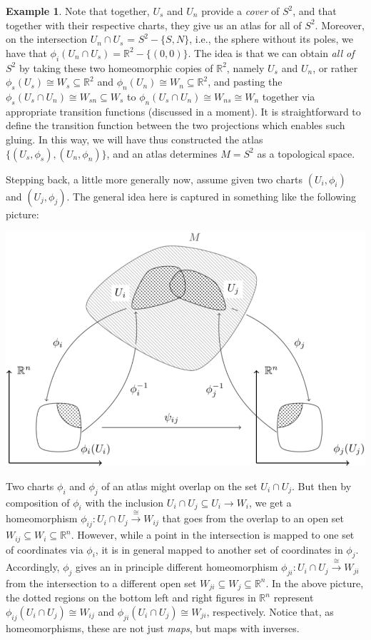 \documentclass[a4paper]{book}
\theoremstyle{definition}
\newtheorem{example}{Example}[section]
\theoremstyle{definition}
\theoremstyle{definition}
\theoremstyle{theorem}
\theoremstyle{definition}
\begin{document}
\begin{example}
	Note that together, $U_s$ and $U_n$ provide a \textit{cover} of $S^2$, and that together with their respective charts, they give us an atlas for all of $S^2$. Moreover, on the intersection $U_n \cap U_s$ = $S^2 - \{S,N\}$, i.e., the sphere without its poles, we have that $\phi_i(U_n \cap U_s) = \mathbb{R}^2 - \{(0,0)\}$. The idea is that we can obtain \textit{all of} $S^2$ by taking these two homeomorphic copies of $\mathbb{R}^2$, namely $U_s$ and $U_n$, or rather $\phi_s(U_s) \cong W_s \subseteq \mathbb{R}^2$ and $\phi_n(U_n) \cong W_n \subseteq \mathbb{R}^2$, and pasting the $\phi_s(U_s \cap U_n) \cong W_{sn} \subseteq W_s$ to $\phi_n(U_s \cap U_n) \cong W_{ns} \cong W_n$ together via appropriate transition functions (discussed in a moment). It is straightforward to define the transition function between the two projections which enables such gluing. In this way, we will have thus constructed the atlas $\{(U_s, \phi_s), (U_n, \phi_n)\}$, and an atlas determines $M = S^2$ as a topological space. \par 
	Stepping back, a little more generally now, assume given two charts $(U_i, \phi_i)$ and $(U_j, \phi_j)$. The general idea here is captured in something like the following picture: 
	\begin{center} 
		\includegraphics[scale=0.33]{Manifold1BW.png}
	\end{center} 
	Two charts $\phi_i$ and $\phi_j$ of an atlas might overlap on the set $U_i \cap U_j$. But then by composition of $\phi_i$ with the inclusion $U_i \cap U_j \subseteq U_i \rightarrow W_i$, we get a homeomorphism $\phi_{ij}: U_i \cap U_j \xrightarrow{\cong} W_{ij}$ that goes from the overlap to an open set $W_{ij} \subseteq W_i \subseteq \mathbb{R}^n$. However, while a point in the intersection is mapped to one set of coordinates via $\phi_i$, it is in general mapped to another set of coordinates in $\phi_j$. Accordingly, $\phi_j$ gives an in principle different homeomorphism $\phi_{ji}: U_i \cap U_j \xrightarrow{\cong} W_{ji}$ from the intersection to a different open set $W_{ji} \subseteq W_j \subseteq \mathbb{R}^n$. In the above picture, the dotted regions on the bottom left and right figures in $\mathbb{R}^n$ represent $\phi_{ij} (U_i \cap U_j) \cong W_{ij}$ and $\phi_{ji} (U_i \cap U_j) \cong W_{ji}$, respectively. Notice that, as homeomorphisms, these are not just \textit{maps}, but maps with inverses. \par 

\end{example}
\end{document}
